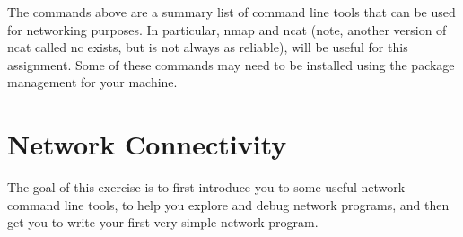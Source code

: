 \documentclass[9pt, addpoints]{exam}
\begin{document}

The commands above are a summary list of command line tools that can be used
for networking purposes. In particular, nmap and ncat (note, another 
version of ncat called nc exists, but is not always as reliable), 
will be useful for this assignment. Some of these commands may need to 
be installed using the package management for your machine.



\section*{Network Connectivity}
The goal of this exercise is to first introduce you to some useful network
command line tools, to help you explore and debug network programs, and 
then get you to write your first very simple network program. 
\end{document}
